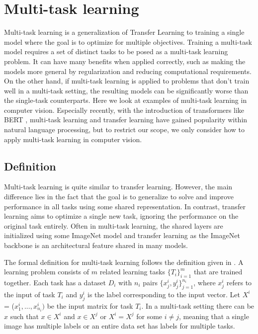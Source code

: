 \chapter{Multi-task learning}
Multi-task learning is a generalization of Transfer Learning to training a single model where the goal is to optimize for multiple objectives. 
Training a multi-task model requires a set of distinct tasks to be posed as a multi-task learning problem.
It can have many benefits when applied correctly, such as making the models more general by regularization and reducing computational requirements.
On the other hand, if multi-task learning is applied to problems that don't train well in a multi-task setting, the resulting models can be significantly worse than the single-task counterparts.
Here we look at examples of multi-task learning in computer vision.
Especially recently, with the introduction of transformers like BERT \citep{bert}, multi-task learning and transfer learning have gained popularity within natural language processing, but to restrict our scope, we only consider how to apply multi-task learning in computer vision. 

\section{Definition}
Multi-task learning is quite similar to transfer learning. 
However, the main difference lies in the fact that the goal is to generalize to solve and improve performance in all tasks using some shared representation. 
In contrast, transfer learning aims to optimize a single new task, ignoring the performance on the original task entirely. 
Often in multi-task learning, the shared layers are initialized using some ImageNet model and transfer learning as the ImageNet backbone is an architectural feature shared in many models.

The formal definition for multi-task learning follows the definition given in \citep{surveyOnMultiTask}. 
A learning problem consists of ${m}$ related learning tasks ${\{T_i\}_{i=1}^m}$ that are trained together. 
Each task has a dataset ${D_i}$ with ${n_i}$ pairs ${\{x_{j}^{i}, y_{j}^{i}\}_{j=1}^{n_i}}$, where ${x_{j}^{i}}$ refers to the input of task ${T_i}$ and ${y_{j}^{i}}$ is the label corresponding to the input vector.
Let ${X^i}$ = (${x_{1}^{i}, ... , x_{n_i}^{i})}$ be the input matrix for task ${T_i}$.
In a multi-task setting there can be ${x}$ such that ${x \in X^i}$ and ${x \in X^j}$ or ${X^i = X^j}$ for some ${i \ne j}$, meaning that a single image has multiple labels or an entire data set has labels for multiple tasks.

